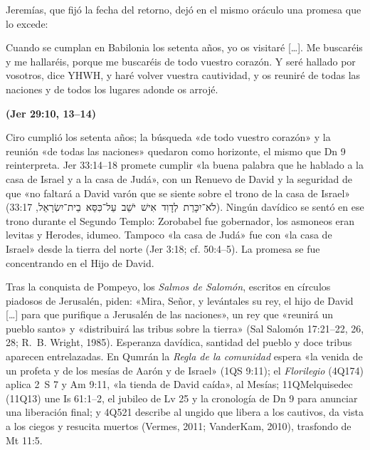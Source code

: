 \documentclass[11pt,letterpaper]{article}
\newcommand{\heb}[1]{\mbox{\foreignlanguage{hebrew}{#1}}}
\newcommand{\hebverso}[1]{\par\needspace{7\baselineskip}\smallskip{\centering\begin{otherlanguage}{hebrew}\large #1\end{otherlanguage}\par}\smallskip}
\newcommand{\fuente}[1]{\par\hfill{\upshape\bfseries\small\textcolor{ladrillo}{#1}}}
\begin{document}
Jeremías, que fijó la fecha del retorno, dejó en el mismo oráculo una promesa que lo excede:
\hebverso{ושבתי את שבותכם וקבצתי אתכם מכל הגוים}
\begin{cita}Cuando se cumplan en Babilonia los setenta años, yo os visitaré [\ldots]. Me buscaréis y me hallaréis, porque me buscaréis de todo vuestro corazón. Y seré hallado por vosotros, dice YHWH, y haré volver vuestra cautividad, y os reuniré de todas las naciones y de todos los lugares adonde os arrojé.\fuente{(Jer 29:10, 13--14)}\end{cita}
Ciro cumplió los setenta años; la búsqueda «de todo vuestro corazón» y la reunión «de todas las naciones» quedaron como horizonte, el mismo que Dn 9 reinterpreta. Jer 33:14--18 promete cumplir «la buena palabra que he hablado a la casa de Israel y a la casa de Judá», con un Renuevo de David y la seguridad de que «no faltará a David varón que se siente sobre el trono de la casa de Israel» (\heb{לֹא־יִכָּרֵת לְדָוִד אִישׁ יֹשֵׁב עַל־כִּסֵּא בֵית־יִשְׂרָאֵל}, 33:17). Ningún davídico se sentó en ese trono durante el Segundo Templo: Zorobabel fue gobernador, los asmoneos eran levitas y Herodes, idumeo. Tampoco «la casa de Judá» fue con «la casa de Israel» desde la tierra del norte (Jer 3:18; cf. 50:4--5). La promesa se fue concentrando en el Hijo de David.

Tras la conquista de Pompeyo, los \emph{Salmos de Salomón}, escritos en círculos piadosos de Jerusalén, piden: «Mira, Señor, y levántales su rey, el hijo de David [\ldots] para que purifique a Jerusalén de las naciones», un rey que «reunirá un pueblo santo» y «distribuirá las tribus sobre la tierra» (Sal Salomón 17:21--22, 26, 28; R.~B. Wright, 1985). Esperanza davídica, santidad del pueblo y doce tribus aparecen entrelazadas. En Qumrán la \emph{Regla de la comunidad} espera «la venida de un profeta y de los mesías de Aarón y de Israel» (1QS 9:11); el \emph{Florilegio} (4Q174) aplica 2~S 7 y Am 9:11, «la tienda de David caída», al Mesías; 11QMelquisedec (11Q13) une Is 61:1--2, el jubileo de Lv 25 y la cronología de Dn 9 para anunciar una liberación final; y 4Q521 describe al ungido que libera a los cautivos, da vista a los ciegos y resucita muertos (Vermes, 2011; VanderKam, 2010), trasfondo de Mt 11:5.
\end{document}
